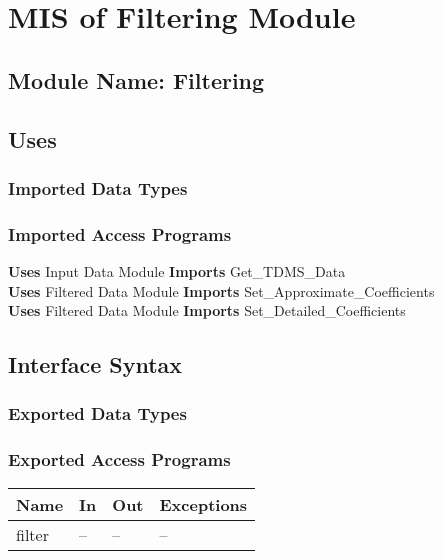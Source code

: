 \documentclass[12pt]{article}
\begin{document}
\section{MIS of Filtering Module}
\subsection{Module Name: Filtering}
\subsection{Uses}
\subsubsection{Imported Data Types}

\subsubsection{Imported Access Programs}
\textbf{Uses} Input Data Module \textbf{Imports} Get\_TDMS\_Data\\
\textbf{Uses} Filtered Data Module 
\textbf{Imports} Set\_Approximate\_Coefficients\\
\textbf{Uses} Filtered Data Module 
\textbf{Imports} Set\_Detailed\_Coefficients
\subsection{Interface Syntax}
\subsubsection{Exported Data Types}

\subsubsection{Exported Access Programs}
\begin{center}
\begin{tabular}{l l l l}
\hline
\textbf{Name} & \textbf{In} & \textbf{Out} & \textbf{Exceptions} \\ \hline
filter & -- & -- & --\\
\hline
\end{tabular}
\end{center}
\end{document}
